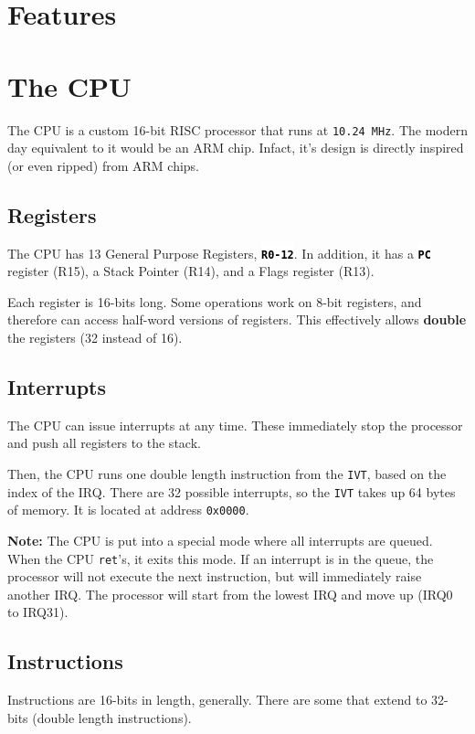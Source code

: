 \documentclass[10pt,a4paper]{article}
\def\tcode#1{\texttt{#1}}
\newcommand{\tbold}[1]{\textbf{#1}}
\newcommand{\creg}[1] {\colorbox{white}{\textcolor{black}{\tcode{\tbold{#1}}}}}
\begin{document}
	\section{Features}
		
	
	\section{The CPU}
		The CPU is a custom 16-bit RISC processor that runs at \tcode{10.24 MHz}.
		The modern day equivalent to it would be an ARM chip. Infact, it's design is directly inspired (or even ripped) from ARM chips.
		\subsection{Registers}
			The CPU has 13 General Purpose Registers, \creg{R0-12}. In addition, it has a \creg{PC} register (R15), a Stack Pointer (R14), and a Flags register (R13).
						
			Each register is 16-bits long. Some operations work on 8-bit registers, and therefore can access half-word versions of registers. This effectively allows \tbold{double} the registers (32 instead of 16).
		\subsection{Interrupts}
			The CPU can issue interrupts at any time. These immediately stop the processor and push all registers to the stack.
			
			Then, the CPU runs one double length instruction from the \tcode{IVT}, based on the index of the IRQ.
			There are 32 possible interrupts, so the \tcode{IVT} takes up 64 bytes of memory. It is located at address \tcode{0x0000}.
			
			\tbold{Note:} The CPU is put into a special mode where all interrupts are queued. When the CPU \tcode{ret}'s, it exits this mode. If an interrupt is in the queue, the processor will not execute the next instruction, but will immediately raise another IRQ. The processor will start from the lowest IRQ and move up (IRQ0 to IRQ31).
		\subsection{Instructions}
			Instructions are 16-bits in length, generally. There are some that extend to 32-bits (double length instructions).
			
\end{document}
